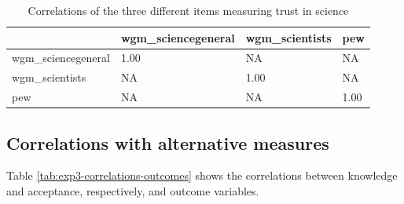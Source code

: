 \documentclass[
  doc,floatsintext]{apa6}
\begin{document}
\begin{table}[h]

\begin{center}
\begin{threeparttable}

\caption{\label{tab:exp3-correlation-trust}Correlations of the three different items measuring trust in science}

\begin{tabular}{llll}
\toprule
 & \multicolumn{1}{c}{wgm\_sciencegeneral} & \multicolumn{1}{c}{wgm\_scientists} & \multicolumn{1}{c}{pew}\\
\midrule
wgm\_sciencegeneral & 1.00 & NA & NA\\
wgm\_scientists & NA & 1.00 & NA\\
pew & NA & NA & 1.00\\
\bottomrule
\end{tabular}

\end{threeparttable}
\end{center}

\end{table}

\subsection{Correlations with alternative measures}\label{correlations-with-alternative-measures-2}

Table \ref{tab:exp3-correlations-outcomes} shows the correlations between knowledge and acceptance, respectively, and outcome variables.
\end{document}
